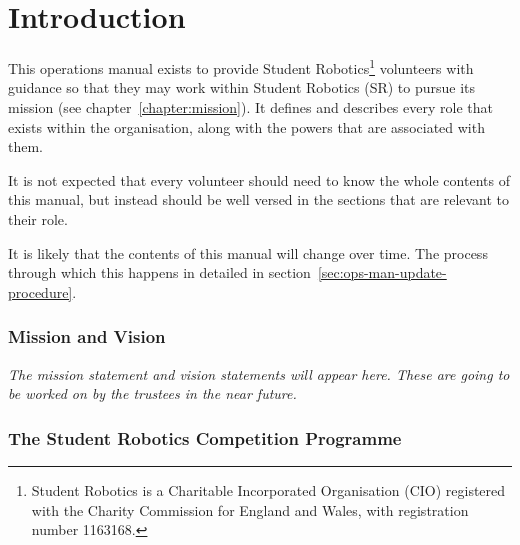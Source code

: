 \chapter{Introduction}

This operations manual exists to provide Student Robotics\footnote{Student Robotics is a Charitable Incorporated Organisation (CIO) registered with the Charity Commission for England and Wales, with registration number 1163168.} volunteers with guidance so that they may work within Student Robotics (SR) to pursue its mission (see chapter~\ref{chapter:mission}).  It defines and describes every role that exists within the organisation, along with the powers that are associated with them.

It is not expected that every volunteer should need to know the whole contents of this manual, but instead should be well versed in the sections that are relevant to their role.

It is likely that the contents of this manual will change over time.  The process through which this happens in detailed in section~\ref{sec:ops-man-update-procedure}.


\subsection{Mission and Vision}

\textit{The mission statement and vision statements will appear here.  These are going to be worked on by the trustees in the near future.}

\subsection{The Student Robotics Competition Programme}

